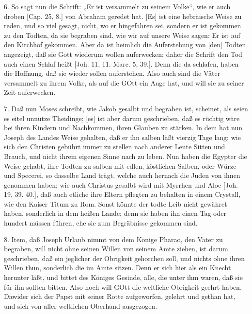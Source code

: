 6. So sagt nun die Schrift: „Er ist versammelt zu seinem Volke“, wie er auch droben [Cap. 25, 8.] von Abraham geredet hat. [Es] ist eine hebräische Weise zu reden, und so viel gesagt, nicht, wo er hingefahren sei, sondern er ist gekommen zu den Todten, da sie begraben sind, wie wir auf unsere Weise sagen: Er ist auf den Kirchhof gekommen. Aber da ist heimlich die Auferstehung von [den] Todten angezeigt, daß sie Gott wiederum wollen auferwecken; daher die Schrift den Tod auch einen Schlaf heißt [Joh. 11, 11. Marc. 5, 39.]. Denn die da schlafen, haben die Hoffnung, daß sie wieder sollen auferstehen. Also auch sind die Väter versammelt zu ihrem Volke, als auf die GOtt ein Auge hat, und will sie zu seiner Zeit auferwecken.

7. Daß nun Moses schreibt, wie Jakob gesalbt und begraben ist, scheinet, als seien es eitel unnütze Theidinge; [es] ist aber darum geschrieben, daß es rüchtig wäre bei ihren Kindern und Nachkommen, ihren Glauben zu stärken. In dem hat nun Joseph des Landes Weise gehalten, daß er ihn salben läßt vierzig Tage lang; wie sich den Christen gebührt immer zu stellen nach anderer Leute Sitten und Brauch, und nicht ihrem eigenen Sinne nach zu leben. Nun haben die Egypter die Weise gehabt, ihre Todten zu salben mit edlen, köstlichen Salben, oder Würze und Specerei, so dasselbe Land trägt, welche auch hernach die Juden von ihnen genommen haben; wie auch Christus gesalbt wird mit Myrrhen und Aloe [Joh. 19, 39. 40.], daß auch etliche ihre Eltern pflegten zu behalten in einem Crystall, wie den Kaiser Titum zu Rom. Sonst könnte der todte Leib nicht gewähret haben, sonderlich in dem heißen Lande; denn sie haben ihn einen Tag oder hundert müssen führen, ehe sie zum Begräbnisse gekommen sind.

8. Item, daß Joseph Urlaub nimmt von dem Könige Pharao, den Vater zu begraben, will nicht ohne seinen Willen von seinem Amte ziehen, ist darum geschrieben, daß ein jeglicher der Obrigkeit gehorchen soll, und nichts ohne ihren Willen thun, sonderlich die im Amte sitzen. Denn er sich hier als ein Knecht herunter läßt, und bittet des Königes Gesinde, alle, die unter ihm waren, daß sie für ihn sollten bitten. Also hoch will GOtt die weltliche Obrigkeit geehrt haben. Dawider sich der Papst mit seiner Rotte aufgeworfen, gelehrt und gethan hat, und sich von aller weltlichen Oberhand ausgezogen.

